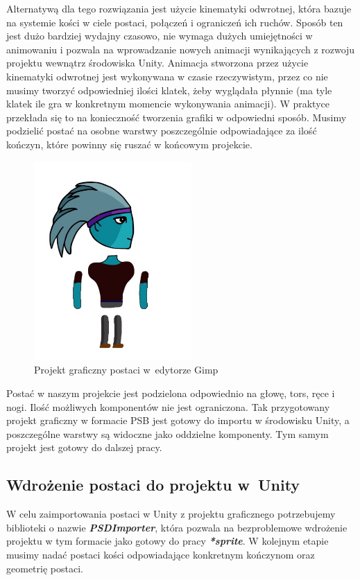 \documentclass[oneside,polski,logo]{amuthesis}
\begin{document}
Alternatywą dla tego rozwiązania jest użycie kinematyki odwrotnej, która bazuje na systemie kości w ciele postaci, połączeń i ograniczeń ich ruchów. Sposób ten jest dużo bardziej wydajny czasowo, nie wymaga dużych umiejętności w animowaniu i pozwala na wprowadzanie nowych animacji wynikających z rozwoju projektu wewnątrz środowiska Unity. Animacja stworzona przez użycie kinematyki odwrotnej jest wykonywana w czasie rzeczywistym, przez co nie musimy tworzyć odpowiedniej ilości klatek, żeby wyglądała płynnie (ma tyle klatek ile gra w konkretnym momencie wykonywania animacji).
W praktyce przekłada się to na konieczność tworzenia grafiki w odpowiedni sposób. Musimy podzielić postać na osobne warstwy poszczególnie odpowiadające za ilość kończyn, które powinny się ruszać w końcowym projekcie.\\

\begin{figure}[h]
	\centering
	\includegraphics[width=6cm]{images/kozubal/separatedCharacter.jpg}
	\caption{Projekt graficzny postaci w~edytorze Gimp}
\end{figure}

Postać w naszym projekcie jest podzielona odpowiednio na głowę, tors, ręce i nogi. Ilość możliwych komponentów nie jest ograniczona. Tak przygotowany projekt graficzny w formacie PSB jest gotowy do importu w środowisku Unity, a poszczególne warstwy są widoczne jako oddzielne komponenty. Tym samym projekt jest gotowy do dalszej pracy.
\subsection{Wdrożenie postaci do projektu w~Unity}
W celu zaimportowania postaci w Unity z projektu graficznego potrzebujemy biblioteki o nazwie \textbf{\textit{PSDImporter}}, która pozwala na bezproblemowe wdrożenie projektu w tym formacie jako gotowy do pracy \textbf{\textit{*sprite}}. W kolejnym etapie musimy nadać postaci kości odpowiadające konkretnym kończynom oraz geometrię postaci.
\end{document}
